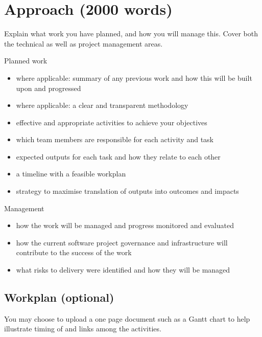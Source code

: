 \documentclass[12pt]{article}
\newenvironment{instruction}{%
    \begin{tcolorbox}[colback=red!5,colframe=red,title=Instruction]%
}{%
    \end{tcolorbox}%
}
\begin{document}
\pagebreak

\section*{Approach (2000 words)}

\begin{instruction}

Explain what work you have planned, and how you will manage this. Cover both the technical as well as project management areas.

Planned work

    \begin{itemize}
        \item where applicable: summary of any previous work and how this will be built upon and progressed
        \item where applicable: a clear and transparent methodology
        \item effective and appropriate activities to achieve your objectives
        \item which team members are responsible for each activity and task
        \item expected outputs for each task and how they relate to each other
        \item a timeline with a feasible workplan
        \item strategy to maximise translation of outputs into outcomes and impacts
    \end{itemize}

Management

    \begin{itemize}
        \item how the work will be managed and progress monitored and evaluated
        \item how the current software project governance and infrastructure will contribute to the success of the work
        \item what risks to delivery were identified and how they will be managed
    \end{itemize}


\end{instruction}



\subsection*{Workplan (optional)}

\begin{instruction}
You may choose to upload a one page document such as a Gantt chart to help illustrate timing of and links among the activities.
\end{instruction}
\end{document}
